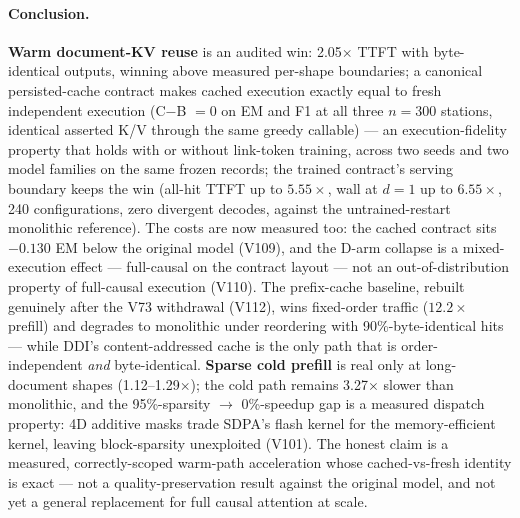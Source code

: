 \paragraph{Conclusion.}
\textbf{Warm document-KV reuse} is an audited win: 2.05$\times$ TTFT with
byte-identical outputs, winning above measured per-shape boundaries; a
canonical persisted-cache contract makes cached execution exactly equal to
fresh independent execution (C$-$B $=0$ on EM and F1 at all three
$n{=}300$ stations, identical asserted K/V through the same greedy
callable) --- an execution-fidelity property that holds with or without
link-token training, across two seeds and two model families on the same
frozen records; the trained contract's serving boundary keeps the win
(all-hit TTFT up to $5.55\times$, wall at $d{=}1$ up to $6.55\times$, 240
configurations, zero divergent decodes, against the untrained-restart
monolithic reference). The costs are now measured too: the cached contract
sits $-0.130$ EM below the original model (V109), and the D-arm collapse is
a mixed-execution effect --- full-causal on the contract layout --- not an
out-of-distribution property of full-causal execution (V110). The
prefix-cache baseline, rebuilt genuinely after the V73 withdrawal (V112),
wins fixed-order traffic ($12.2\times$ prefill) and degrades to monolithic
under reordering with 90\%-byte-identical hits --- while DDI's
content-addressed cache is the only path that is order-independent
\emph{and} byte-identical.
\textbf{Sparse cold prefill} is real only at long-document shapes
(1.12--1.29$\times$); the cold path remains 3.27$\times$ slower than
monolithic, and the 95\%-sparsity $\to$ 0\%-speedup gap is a measured
dispatch property: 4D additive masks trade SDPA's flash kernel for the
memory-efficient kernel, leaving block-sparsity unexploited (V101). The
honest claim is a measured, correctly-scoped warm-path acceleration whose
cached-vs-fresh identity is exact --- not a quality-preservation result
against the original model, and not yet a general replacement for full
causal attention at scale.

